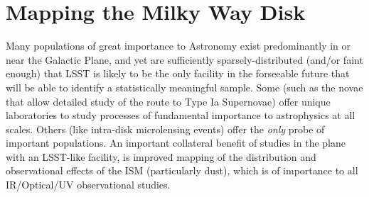 %
%
%
%
%
%
%

\section{Mapping the Milky Way Disk}
\def\secname{MW_Disk}\label{sec:\secname} %




Many populations of great importance to Astronomy exist predominantly
in or near the Galactic Plane, and yet are sufficiently
sparsely-distributed (and/or faint enough) that LSST is likely to be
the only facility in the forseeable future that will be able to
identify a statistically meaningful sample. Some (such as the novae
that allow detailed study of the route to Type Ia Supernovae) offer
unique laboratories to study processes of fundamental importance to
astrophysics at all scales. Others (like intra-disk microlensing
events) offer the {\it only} probe of important populations. An
important collateral benefit of studies in the plane with an LSST-like
facility, is improved mapping of the distribution and observational
effects of the ISM (particularly dust), which is of importance to all
IR/Optical/UV observational studies.


